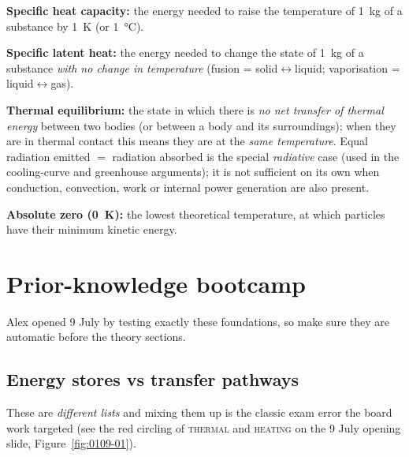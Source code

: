 \documentclass[11pt,a4paper]{article}
\begin{document}
\begin{keybox}
\textbf{Specific heat capacity:} the energy needed to raise the temperature of
\SI{1}{\kilogram} of a substance by \SI{1}{\kelvin} (or \SI{1}{\celsius}).

\textbf{Specific latent heat:} the energy needed to change the state of \SI{1}{\kilogram}
of a substance \emph{with no change in temperature} (fusion = solid$\leftrightarrow$liquid;
vaporisation = liquid$\leftrightarrow$gas).

\textbf{Thermal equilibrium:} the state in which there is \emph{no net transfer of thermal
energy} between two bodies (or between a body and its surroundings); when they are in
thermal contact this means they are at the \emph{same temperature}. Equal radiation emitted
$=$ radiation absorbed is the special \emph{radiative} case (used in the cooling-curve and
greenhouse arguments); it is not sufficient on its own when conduction, convection, work or
internal power generation are also present.

\textbf{Absolute zero (\SI{0}{K}):} the lowest theoretical temperature, at which particles
have their minimum kinetic energy.
\end{keybox}

\clearpage
\section{Prior-knowledge bootcamp}

Alex opened 9 July by testing exactly these foundations, so make sure they are automatic
before the theory sections.

\subsection{Energy stores vs transfer pathways}

These are \emph{different lists} and mixing them up is the classic exam error the board
work targeted (see the red circling of \textsc{thermal} and \textsc{heating} on the 9 July
opening slide, Figure~\ref{fig:0109-01}).
\end{document}
